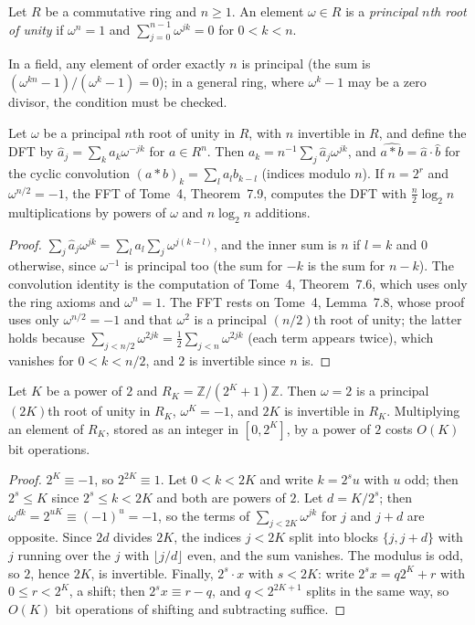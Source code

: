 \begin{definition}
Let $R$ be a commutative ring and $n\ge1$. An element $\omega\in R$ is a \emph{principal $n$th root of unity} if $\omega^n=1$ and $\sum_{j=0}^{n-1}\omega^{jk}=0$ for $0<k<n$.
\end{definition}

In a field, any element of order exactly $n$ is principal (the sum is $(\omega^{kn}-1)/(\omega^k-1)=0$); in a general ring, where $\omega^k-1$ may be a zero divisor, the condition must be checked.

\begin{proposition}\label{prop:ringdft}
Let $\omega$ be a principal $n$th root of unity in $R$, with $n$ invertible in $R$, and define the DFT by $\hat a_j=\sum_ka_k\omega^{-jk}$ for $a\in R^n$. Then $a_k=n^{-1}\sum_j\hat a_j\omega^{jk}$, and $\widehat{a*b}=\hat a\cdot\hat b$ for the cyclic convolution $(a*b)_k=\sum_la_lb_{k-l}$ (indices modulo $n$). If $n=2^r$ and
$\omega^{n/2}=-1$, the FFT of Tome~4, Theorem~7.9, computes the DFT with $\frac n2\log_2n$ multiplications by powers of $\omega$ and $n\log_2n$ additions.
\end{proposition}
\begin{proof}
$\sum_j\hat a_j\omega^{jk}=\sum_la_l\sum_j\omega^{j(k-l)}$, and the inner sum is $n$ if $l=k$ and $0$ otherwise, since $\omega^{-1}$ is principal too (the sum for $-k$ is the sum for $n-k$). The convolution identity is the computation of Tome~4, Theorem~7.6, which uses only the ring axioms and $\omega^n=1$. The FFT rests on Tome~4, Lemma~7.8, whose proof uses only
$\omega^{n/2}=-1$ and that $\omega^2$ is a principal $(n/2)$th root of unity; the latter holds because $\sum_{j<n/2}\omega^{2jk}=\frac12\sum_{j<n}\omega^{2jk}$ (each term appears twice), which vanishes for $0<k<n/2$, and $2$ is invertible since $n$ is.
\end{proof}

\begin{lemma}\label{lem:fermatring}
Let $K$ be a power of $2$ and $R_K=\mathbb Z/(2^K+1)\mathbb Z$. Then $\omega=2$ is a principal $(2K)$th root of unity in $R_K$, $\omega^K=-1$, and $2K$ is invertible in $R_K$. Multiplying an element of $R_K$, stored as an integer in $[0,2^K]$, by a power of $2$ costs $O(K)$ bit operations.
\end{lemma}
\begin{proof}
$2^K\equiv-1$, so $2^{2K}\equiv1$. Let $0<k<2K$ and write $k=2^su$ with $u$ odd; then $2^s\le K$ since $2^s\le k<2K$ and both are powers of $2$. Let $d=K/2^s$; then $\omega^{dk}=2^{uK}\equiv(-1)^u=-1$, so the terms of $\sum_{j<2K}\omega^{jk}$ for $j$ and $j+d$ are opposite. Since $2d$ divides $2K$, the indices $j<2K$ split into blocks
$\{j,j+d\}$ with $j$ running over the $j$ with $\lfloor j/d\rfloor$ even, and the sum vanishes. The modulus is odd, so $2$, hence $2K$, is invertible. Finally, $2^s\cdot x$ with $s<2K$: write $2^sx=q2^K+r$ with $0\le r<2^K$, a shift; then $2^sx\equiv r-q$, and $q<2^{2K+1}$ splits in the same way, so $O(K)$ bit operations of shifting and subtracting suffice.
\end{proof}

